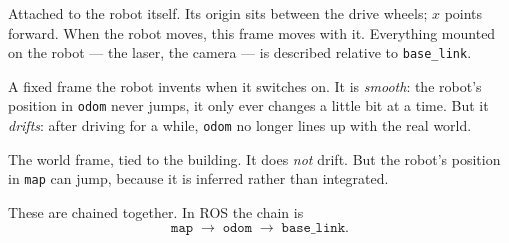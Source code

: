 \documentclass[11pt,a4paper]{report}
\newcommand{\file}[1]{\texttt{\small #1}}
\begin{document}
\begin{plain}
\begin{description}[leftmargin=2.6cm,style=nextline,font=\ttfamily\color{teal}]
\item[base\_link] Attached to the robot itself. Its origin sits between the
drive wheels; $x$ points forward. When the robot moves, this frame moves with
it. Everything mounted on the robot --- the laser, the camera --- is described
relative to \file{base\_link}.
\item[odom] A fixed frame the robot invents when it switches on. It is
\emph{smooth}: the robot's position in \file{odom} never jumps, it only ever
changes a little bit at a time. But it \emph{drifts}: after driving for a
while, \file{odom} no longer lines up with the real world.
\item[map] The world frame, tied to the building. It does \emph{not} drift.
But the robot's position in \file{map} can jump, because it is inferred rather
than integrated.
\end{description}
\end{plain}

These are chained together. In ROS the chain is
\[
\texttt{map} \;\longrightarrow\; \texttt{odom} \;\longrightarrow\;
\texttt{base\_link}.
\]
\end{document}
